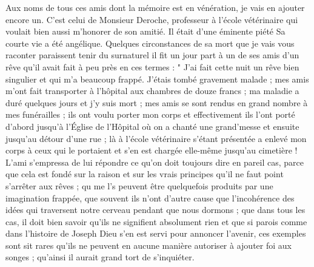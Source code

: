 \documentclass[11pt,a4paper]{report}
\begin{document}
Aux noms de tous ces amis dont la mémoire est en vénération, je vais en ajouter encore un. C'est celui de Monsieur Deroche, professeur à l'école vétérinaire qui voulait bien aussi m'honorer de son amitié. Il était d'une éminente piété Sa courte vie a été angélique. Quelques circonstances de sa mort que je vais vous raconter paraissent tenir du surnaturel il fit un jour part à un de ses amis d'un rêve qu'il avait fait à peu près en ces termes : " J'ai fait cette nuit un rêve bien singulier et qui m'a beaucoup frappé. J'étais tombé gravement malade ; mes amis m'ont fait transporter à l'hôpital aux chambres de douze francs ; ma maladie a duré quelques jours et j'y suis mort ; mes amis se sont rendus en grand nombre à mes funérailles ; ils ont voulu porter mon corps et effectivement ils l'ont porté d'abord jusqu'à l'Église de l'Hôpital où on a chanté une grand'messe et ensuite jusqu'au détour d'une rue ; là à l'école vétérinaire s'étant présentée a enlevé mon corps à ceux qui le portaient et s'en est chargée elle-même jusqu'au cimetière ! L'ami s'empressa de lui répondre ce qu'on doit toujours dire en pareil cas, parce que cela est fondé sur la raison et sur les vrais principes qu'il ne faut point s'arrêter aux rêves ; qu me l's peuvent être quelquefois produits par une imagination frappée, que souvent ils n'ont d'autre cause que l'incohérence des idées qui traversent notre cerveau pendant que nous dormons ; que dans tous les cas, il doit bien savoir qu'ils ne signifient absolument rien et que si parois comme dans l'histoire de Joseph Dieu s'en est servi pour annoncer l'avenir, ces exemples sont sit rares qu'ils ne peuvent en aucune manière autoriser à ajouter foi aux songes ; qu'ainsi il aurait grand tort de s'inquiéter.
\end{document}
